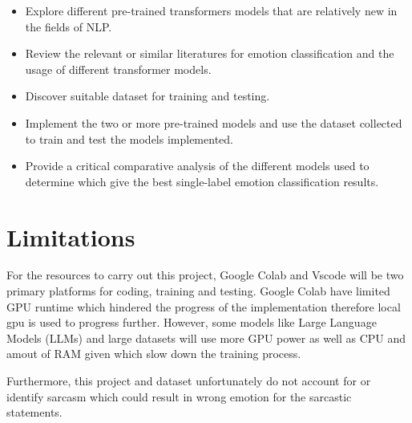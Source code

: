 \begin{itemize}
    \item Explore different pre-trained transformers models that are relatively new in the fields of NLP.
    \item Review the relevant or similar literatures for emotion classification and the usage of different transformer models.
    \item Discover suitable dataset for training and testing.
    \item Implement the two or more pre-trained models and use the dataset collected to train and test the models implemented.
    \item Provide a critical comparative analysis of the different models used to determine which give the best single-label emotion classification results.
\end{itemize}

\section{Limitations}

For the resources to carry out this project, Google Colab and Vscode will be two primary platforms for coding, training and testing.
Google Colab have limited GPU runtime which hindered the progress of the implementation therefore local gpu is used to progress further.
However, some models like Large Language Models (LLMs) and large datasets will use more GPU power as well as CPU and amout of RAM given which slow down the training process.

Furthermore, this project and dataset unfortunately do not account for or identify sarcasm which could result in wrong emotion for the sarcastic statements.
